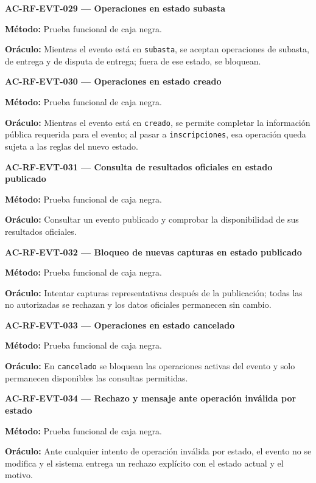 \documentclass[10pt,letterpaper]{article}
\begin{document}
\noindent\textbf{AC-RF-EVT-029 --- Operaciones en estado subasta}\par
\textbf{Método:} Prueba funcional de caja negra.\par
\textbf{Oráculo:} Mientras el evento está en \texttt{subasta}, se aceptan operaciones de subasta, de entrega y de disputa de entrega; fuera de ese estado, se bloquean.\par\vspace{0.45em}
\noindent\textbf{AC-RF-EVT-030 --- Operaciones en estado creado}\par
\textbf{Método:} Prueba funcional de caja negra.\par
\textbf{Oráculo:} Mientras el evento está en \texttt{creado}, se permite completar la información pública requerida para el evento; al pasar a \texttt{inscripciones}, esa operación queda sujeta a las reglas del nuevo estado.\par\vspace{0.45em}
\noindent\textbf{AC-RF-EVT-031 --- Consulta de resultados oficiales en estado publicado}\par
\textbf{Método:} Prueba funcional de caja negra.\par
\textbf{Oráculo:} Consultar un evento publicado y comprobar la disponibilidad de sus resultados oficiales.\par\vspace{0.45em}
\noindent\textbf{AC-RF-EVT-032 --- Bloqueo de nuevas capturas en estado publicado}\par
\textbf{Método:} Prueba funcional de caja negra.\par
\textbf{Oráculo:} Intentar capturas representativas después de la publicación; todas las no autorizadas se rechazan y los datos oficiales permanecen sin cambio.\par\vspace{0.45em}
\noindent\textbf{AC-RF-EVT-033 --- Operaciones en estado cancelado}\par
\textbf{Método:} Prueba funcional de caja negra.\par
\textbf{Oráculo:} En \texttt{cancelado} se bloquean las operaciones activas del evento y solo permanecen disponibles las consultas permitidas.\par\vspace{0.45em}
\noindent\textbf{AC-RF-EVT-034 --- Rechazo y mensaje ante operación inválida por estado}\par
\textbf{Método:} Prueba funcional de caja negra.\par
\textbf{Oráculo:} Ante cualquier intento de operación inválida por estado, el evento no se modifica y el sistema entrega un rechazo explícito con el estado actual y el motivo.\par\vspace{0.45em}
\end{document}
